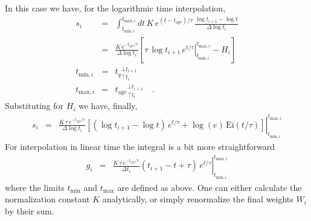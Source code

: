 \documentclass[12pt, letterpaper, preprint]{aastex}
\newcommand{\tmin}[1][]{t_{\mathrm{min} #1}}
\newcommand{\tmax}[1][]{t_{\mathrm{max} #1}}
\newcommand{\dlt}{\Delta\log t_i}
\newcommand{\dt}{\Delta t_i}
\newcommand{\tintegral}{\int_{\tmin[,i]}^{\tmax[,i]} dt}
\newcommand{\tinterval}{\right|_{\tmin[,i]}^{\tmax[,i]}}
\newcommand{\clip}[3][]{{#1}_{\top {#2}}^{\bot {#3}}}
\newcommand{\tage}{t_{\mathrm{age}}}
\begin{document}
In this case we have, for the logarithmic time interpolation,
\begin{eqnarray}
s_i  & = & \tintegral \, K \, e^{(t-\tage) /\tau}\, \frac{\log t_{i+1} - \log t}{\dlt} \nonumber \\
      & = & \frac{K \, e^{-\tage/\tau}}{\dlt} \left[ \left. \tau \, \log t_{i+1} \, e^{t/\tau} \tinterval -  H_i\right] \nonumber \\
\tmin[,i] & = & \clip[t_q]{t_i}{t_{i+1}} \nonumber \\
\tmax[,i] & = & \clip[\tage]{t_i}{t_{i+1}} \quad . \nonumber
\end{eqnarray}
Substituting for $H_i$ we have, finally, 
\begin{eqnarray}
s_i & = & \left. \frac{K \, \tau \, e^{-\tage/\tau}}{\dlt} \left [(\log t_{i+1} - \log t)\, e^{t/\tau} + 
          \log(e) \, \mathrm{Ei}(t/\tau)\right]  \tinterval
\end{eqnarray}
For interpolation in linear time the integral is a bit more straightforward
\begin{eqnarray}
g_i & = & \left. \frac{K \, \tau \, e^{-\tage/\tau}}{\dt} (t_{i+1} - t + \tau)\, e^{t/\tau} \tinterval
\end{eqnarray}
where the limits $\tmin$ and $\tmax$ are defined as above.
One can either calculate the normalization constant $K$ analytically, or simply renormalize the final weights $W_i$ by their sum.
\end{document}
